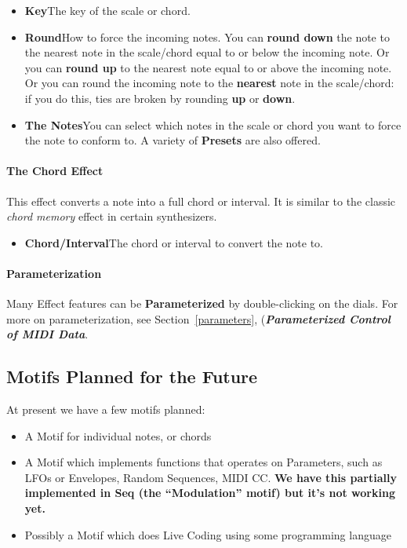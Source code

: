 \documentclass[twoside,10pt]{article}
\begin{document}
\begin{itemize}
\item {\bf Key}\qquad The key of the scale or chord.
\item {\bf Round}\qquad How to force the incoming notes. You can {\bf round down} the note to the nearest note in the scale/chord equal to or below the incoming note.  Or you can {\bf round up} to the nearest note equal to or above the incoming note.  Or you can round the incoming note to the {\bf nearest} note in the scale/chord: if you do this, ties are broken by rounding {\bf up} or {\bf down}.
\item {\bf The Notes}\qquad You can select which notes in the scale or chord you want to force the note to conform to.  A variety of {\bf Presets} are also offered.
\end{itemize}

\paragraph{The Chord Effect}

This effect converts a note into a full chord or interval.  It is similar to the classic {\it chord memory} effect in certain synthesizers.

\begin{itemize}
\item {\bf Chord/Interval}\qquad The chord or interval to convert the note to.
\end{itemize}



\paragraph{Parameterization}

Many Effect features can be {\bf Parameterized} by double-clicking on the dials.  For more on parameterization, see Section~\ref{parameters}, (\textbf{\textit{Parameterized Control of MIDI Data}}.


\clearpage\subsection{Motifs Planned for the Future}

At present we have a few motifs planned:

\begin{itemize}
\item A Motif for individual notes, or chords
\item A Motif which implements functions that operates on Parameters, such as LFOs or Envelopes, Random Sequences, MIDI CC.  {\bf \color{red} We have this partially implemented in Seq (the ``Modulation'' motif) but it's not working yet.}
\item Possibly a Motif which does Live Coding using some programming language
\end{itemize}
\end{document}
